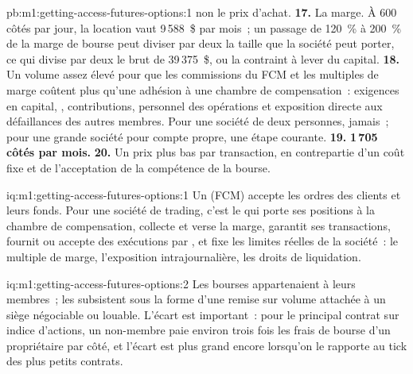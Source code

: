 \begin{solution}{pb:m1:getting-access-futures-options:1}
non le prix d'achat.
\textbf{17.} La marge. À 600 côtés par jour, la location vaut 9\,588~\$ par
mois~; un passage de 120~\% à 200~\% de la marge de bourse peut diviser par deux la taille que
la société peut porter, ce qui divise par deux le brut de 39\,375~\$, ou la contraint à lever
du capital.
\textbf{18.} Un volume assez élevé pour que les commissions du FCM et les multiples de marge
coûtent plus qu'une adhésion à une chambre de compensation~: exigences en capital, ,
contributions, personnel des opérations et exposition directe aux défaillances des autres
membres. Pour une société de deux personnes, jamais~; pour une grande société pour compte propre, une
étape courante.
\textbf{19.} \textbf{1\,705 côtés par mois.}
\textbf{20.} Un prix plus bas par transaction, en contrepartie d'un coût fixe et de
l'acceptation de la compétence de la bourse.
\end{solution}

\begin{solution}{iq:m1:getting-access-futures-options:1}
Un  (FCM) accepte les ordres des clients et leurs fonds. Pour
une société de trading, c'est le  qui porte ses positions à la
chambre de compensation, collecte et verse la marge, garantit ses transactions, fournit
ou accepte des exécutions par , et fixe les limites réelles de la société~: le multiple
de marge, l'exposition intrajournalière, les droits de liquidation.
\end{solution}

\begin{solution}{iq:m1:getting-access-futures-options:2}
Les bourses appartenaient à leurs membres~; les  subsistent sous la forme d'une remise sur volume
attachée à un siège négociable ou louable. L'écart est important~: pour le principal
contrat sur indice d'actions, un non-membre paie environ trois fois les frais de bourse d'un propriétaire
par côté, et l'écart est plus grand encore lorsqu'on le rapporte au tick des
plus petits contrats.
\end{solution}

